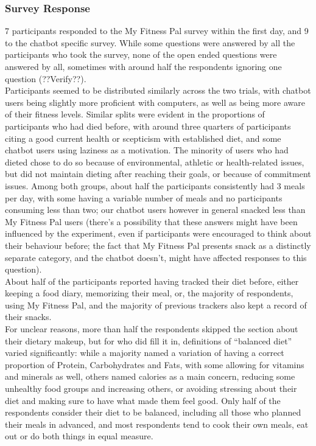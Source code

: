 \subsubsection{Survey Response}
7 participants responded to the My Fitness Pal survey within the first day, and 9 to the chatbot specific survey. While some questions were answered by all the participants who took the survey, none of the open ended questions were answered by all, sometimes with around half the respondents ignoring one question (??Verify??). \\
Participants seemed to be distributed similarly across the two trials, with chatbot users being slightly more proficient with computers, as well as being more aware of their fitness levels. Similar splits were evident in the proportions of participants who had died before, with around three quarters of participants citing a good current health or scepticism with established diet, and some chatbot users using laziness as a motivation. The minority of users who had dieted chose to do so because of environmental, athletic or health-related issues, but did not maintain dieting after reaching their goals, or because of commitment issues. Among both groups, about half the participants consistently had 3 meals per day, with some having a variable number of meals and no participants consuming less than two; our chatbot users however in general snacked less than My Fitness Pal users (there's a possibility that these answers might have been influenced by the experiment, even if participants were encouraged to think about their behaviour before; the fact that My Fitness Pal presents snack as a distinctly separate category, and the chatbot doesn't, might have affected responses to this question). \\
About half of the participants reported having tracked their diet before, either keeping a food diary, memorizing their meal, or, the majority of respondents, using My Fitness Pal, and the majority of previous trackers also kept a record of their snacks. \\
For unclear reasons, more than half the respondents skipped the section about their dietary makeup, but for who did fill it in, definitions of ``balanced diet'' varied significantly: while a majority named a variation of having a correct proportion of Protein, Carbohydrates and Fats, with some allowing for vitamins and minerals as well, others named calories as a main concern, reducing some unhealthy food groups and increasing others, or avoiding stressing about their diet and making sure to have what made them feel good. Only half of the respondents consider their diet to be balanced, including all those who planned their meals in advanced, and most respondents tend to cook their own meals, eat out or do both things in equal measure. \\
